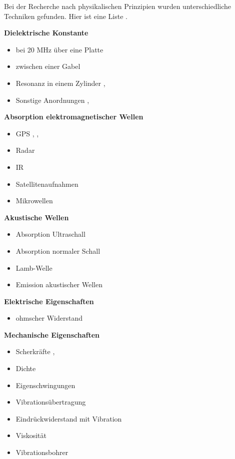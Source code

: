 Bei der Recherche nach physikalischen Prinzipien wurden unterschiedliche Techniken gefunden. Hier ist eine Liste .


\begin{multicols}{2}
\textbf{Dielektrische Konstante}
\begin{itemize}
\item bei 20 MHz über eine Platte \cite{slf}
\item zwischen einer Gabel \cite{fork}
\item Resonanz in einem Zylinder \cite{a2photonicsensors}, \cite{nasa-snowex-2020}
\item Sonstige Anordnungen \cite{Mavrovic.2020}, \cite{PerezDiaz.2017}
\end{itemize}

\textbf{Absorption elektromagnetischer Wellen}
\begin{itemize}
\item GPS \cite{Koch.2019}, \cite{Koch.2014}, \cite{ilmsens-short-range-radar}
\item Radar \cite{Bonnell.2021}
\item IR \cite{Donahue.2022}
\item Satellitenaufnahmen
\item Mikrowellen
\end{itemize}

\textbf{Akustische Wellen}
\begin{itemize}
\item Absorption Ultraschall
\item Absorption normaler Schall \cite{Kinar.2007}
\item Lamb-Welle \cite{lamb}
\item Emission akustischer Wellen
\end{itemize}


\textbf{Elektrische Eigenschaften}
\begin{itemize}
\item ohmscher Widerstand \cite{Abdelaal.2022}
\end{itemize}

\textbf{Mechanische Eigenschaften}
\begin{itemize}
\item Scherkräfte \cite{Hao.2021}, \cite{jstage-snow-density}
\item Dichte \cite{nasa-snow-density}
\item Eigenschwingungen
\item Vibrationsübertragung
\item Eindrückwiderstand mit Vibration
\item Viskosität
\item Vibrationsbohrer
\end{itemize}



\end{multicols}
